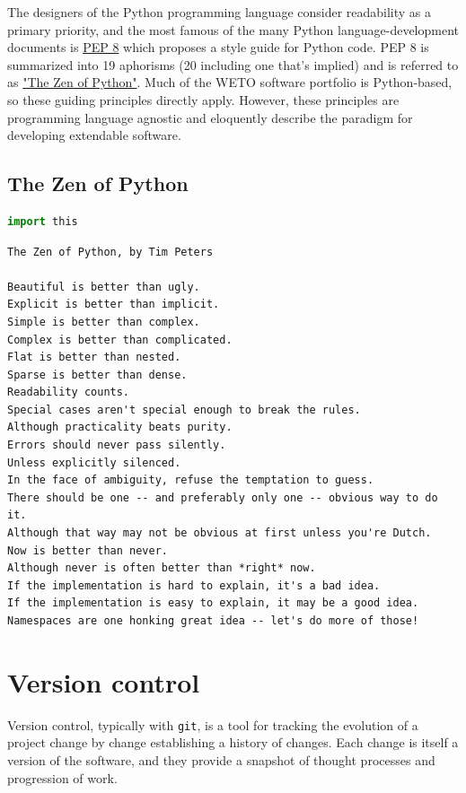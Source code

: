 \documentclass[]{nrel}
\begin{document}
The designers of the Python programming language consider readability as a primary priority, and
the most famous of the many Python language-development documents is
\href{https://peps.python.org/pep-0008/}{PEP 8} which proposes a style guide for Python code.
PEP 8 is summarized into 19 aphorisms (20 including one that’s implied) and is referred to as
\href{https://peps.python.org/pep-0020/}{"The Zen of Python"}. Much of the WETO software portfolio is
Python-based, so these guiding principles directly apply. However, these principles are
programming language agnostic and eloquently describe the paradigm for developing
extendable software.


\subsection{The Zen of Python}
\label{sec:zen}

\begin{lstlisting}[language=Python]
import this
\end{lstlisting}

\begin{lstlisting}
The Zen of Python, by Tim Peters

Beautiful is better than ugly.
Explicit is better than implicit.
Simple is better than complex.
Complex is better than complicated.
Flat is better than nested.
Sparse is better than dense.
Readability counts.
Special cases aren't special enough to break the rules.
Although practicality beats purity.
Errors should never pass silently.
Unless explicitly silenced.
In the face of ambiguity, refuse the temptation to guess.
There should be one -- and preferably only one -- obvious way to do it.
Although that way may not be obvious at first unless you're Dutch.
Now is better than never.
Although never is often better than *right* now.
If the implementation is hard to explain, it's a bad idea.
If the implementation is easy to explain, it may be a good idea.
Namespaces are one honking great idea -- let's do more of those!
\end{lstlisting}


\section{Version control}
\label{sec:version_control}

Version control, typically with \lstinline{git}, is a tool for tracking the evolution of a project change
by change establishing a history of changes.
Each change is itself a version of the software, and they provide a snapshot of thought
processes and progression of work.
\end{document}
